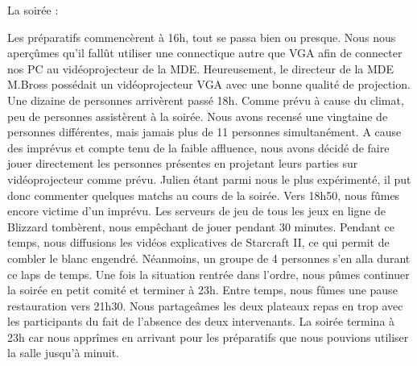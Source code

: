 La soirée :


Les préparatifs commencèrent à 16h, tout se passa bien ou presque. Nous nous aperçûmes
qu’il fallût utiliser une connectique autre que VGA afin de connecter nos PC au
vidéoprojecteur de la MDE. Heureusement, le directeur de la MDE M.Bross possédait un
vidéoprojecteur VGA avec une bonne qualité de projection.
Une dizaine de personnes arrivèrent passé 18h. Comme prévu à cause du climat, peu de
personnes assistèrent à la soirée. Nous avons recensé une vingtaine de personnes
différentes, mais jamais plus de 11 personnes simultanément.
A cause des imprévus et compte tenu de la faible affluence, nous avons décidé de faire jouer
directement les personnes présentes en projetant leurs parties sur vidéoprojecteur comme
prévu. Julien étant parmi nous le plus expérimenté, il put donc commenter quelques matchs
au cours de la soirée.
Vers 18h50, nous fûmes encore victime d’un imprévu. Les serveurs de jeu de tous les jeux en
ligne de Blizzard tombèrent, nous empêchant de jouer pendant 30 minutes. Pendant ce
temps, nous diffusions les vidéos explicatives de Starcraft II, ce qui permit de combler le
blanc engendré. Néanmoins, un groupe de 4 personnes s’en alla durant ce laps de temps.
Une fois la situation rentrée dans l’ordre, nous pûmes continuer la soirée en petit comité et
terminer à 23h. Entre temps, nous fûmes une pause restauration vers 21h30. Nous
partageâmes les deux plateaux repas en trop avec les participants du fait de l’absence des
deux intervenants. La soirée termina à 23h car nous apprîmes en arrivant pour les préparatifs
que nous pouvions utiliser la salle jusqu’à minuit.

